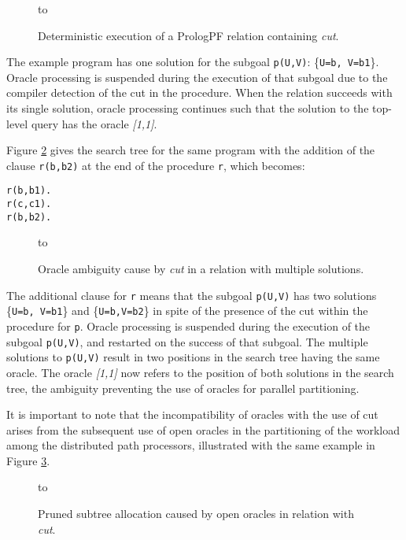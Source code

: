 \begin{figure}[htb]
\vspace{5mm} \hbox to 
\caption{Deterministic execution of a PrologPF relation containing \textit{cut}.}
\vspace{5mm}
\label{cut_det_tree}
\end{figure}

The example program has one solution for the subgoal \texttt{p(U,V)}: \{\texttt{U=b, V=b1}\}.
Oracle processing is suspended during the execution of that subgoal due to the compiler
detection of the cut in the procedure.  When the relation succeeds with its single solution,
oracle processing continues such that the solution to the top-level query has the
oracle \textit{[1,1]}.

Figure \ref{cut_det_tree2} gives the search tree for the same program with the addition of
the clause \texttt{r(b,b2)} at the end of the procedure \texttt{r}, which becomes:
\begin{verbatim}
r(b,b1).
r(c,c1).
r(b,b2).
\end{verbatim}
\begin{figure}[htb]
\vspace{5mm} \hbox to 
\caption{Oracle ambiguity cause by \textit{cut} in a relation with multiple solutions.}
\vspace{5mm}
\label{cut_det_tree2}
\end{figure}

The additional clause for \texttt{r} means that the subgoal \texttt{p(U,V)} has two
solutions \{\texttt{U=b, V=b1}\} and \{\texttt{U=b,V=b2}\} in spite of the presence of
the cut within the procedure for \texttt{p}.  Oracle processing is suspended during the execution
of the subgoal \texttt{p(U,V)}, and restarted on the success of that subgoal.  The
multiple solutions to \texttt{p(U,V)} result in two positions in the search tree having
the same oracle.  The oracle \textit{[1,1]} now refers to the position of both solutions in the
search tree, the ambiguity preventing the use of oracles for parallel partitioning.

It is important to note that the incompatibility of oracles with the use of
cut arises from the subsequent use of
open oracles in the partitioning of the workload among the distributed path processors,
illustrated with the same example in Figure \ref{cut_det_tree3}.

\begin{figure}[htb]
\vspace{5mm} \hbox to 
\caption{Pruned subtree allocation caused by open oracles in relation with \textit{cut}.}
\vspace{5mm}
\label{cut_det_tree3}
\end{figure}

